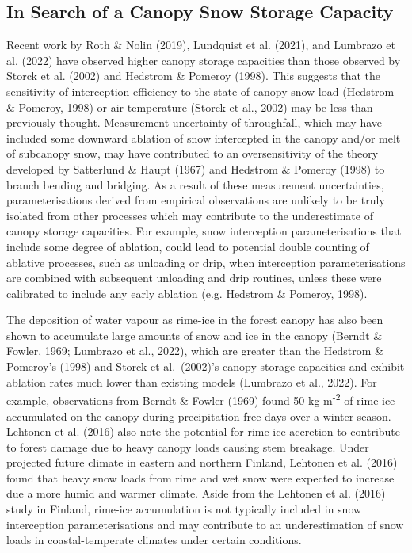\documentclass[
  letterpaper,
]{tex/uofsthesis-cs}
\begin{document}
\subsection{In Search of a Canopy Snow Storage
Capacity}\label{in-search-of-a-canopy-snow-storage-capacity}

Recent work by Roth \& Nolin (2019), Lundquist et al. (2021), and
Lumbrazo et al. (2022) have observed higher canopy storage capacities
than those observed by Storck et al. (2002) and Hedstrom \& Pomeroy
(1998). This suggests that the sensitivity of interception efficiency to
the state of canopy snow load (Hedstrom \& Pomeroy, 1998) or air
temperature (Storck et al., 2002) may be less than previously thought.
Measurement uncertainty of throughfall, which may have included some
downward ablation of snow intercepted in the canopy and/or melt of
subcanopy snow, may have contributed to an oversensitivity of the theory
developed by Satterlund \& Haupt (1967) and Hedstrom \& Pomeroy (1998)
to branch bending and bridging. As a result of these measurement
uncertainties, parameterisations derived from empirical observations are
unlikely to be truly isolated from other processes which may contribute
to the underestimate of canopy storage capacities. For example, snow
interception parameterisations that include some degree of ablation,
could lead to potential double counting of ablative processes, such as
unloading or drip, when interception parameterisations are combined with
subsequent unloading and drip routines, unless these were calibrated to
include any early ablation (e.g. Hedstrom \& Pomeroy, 1998).

The deposition of water vapour as rime-ice in the forest canopy has also
been shown to accumulate large amounts of snow and ice in the canopy
(Berndt \& Fowler, 1969; Lumbrazo et al., 2022), which are greater than
the Hedstrom \& Pomeroy's (1998) and Storck et al.~(2002)'s canopy
storage capacities and exhibit ablation rates much lower than existing
models (Lumbrazo et al., 2022). For example, observations from Berndt \&
Fowler (1969) found 50 kg m\textsuperscript{-2} of rime-ice accumulated
on the canopy during precipitation free days over a winter season.
Lehtonen et al. (2016) also note the potential for rime-ice accretion to
contribute to forest damage due to heavy canopy loads causing stem
breakage. Under projected future climate in eastern and northern
Finland, Lehtonen et al. (2016) found that heavy snow loads from rime
and wet snow were expected to increase due a more humid and warmer
climate. Aside from the Lehtonen et al. (2016) study in Finland,
rime-ice accumulation is not typically included in snow interception
parameterisations and may contribute to an underestimation of snow loads
in coastal-temperate climates under certain conditions.
\end{document}
